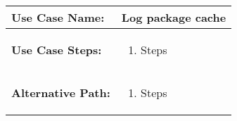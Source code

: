 \medskip

\begin{tabularx}{\linewidth}{|l|X|}
\hline
\textbf{Use Case Name:} & \textbf{Log package cache} \\
\hline
\textbf{Use Case Steps:} & 
\begin{minipage}{\linewidth} 
  \vspace{0.05em}
  \begin{enumerate}
   \item Steps
  \end{enumerate}
  \vspace{0.05em}
\end{minipage}
\\
\hline 
\textbf{Alternative Path:} &
\begin{minipage}{\linewidth}
  \vspace{0.05em} 
  \begin{enumerate}
    \item Steps
  \end{enumerate}
  \vspace{0.05em} 
\end{minipage}
\\
\hline
\end{tabularx}

\newpage


